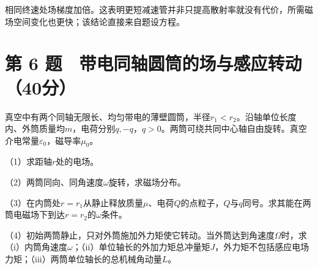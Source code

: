 \documentclass[12pt,a4paper,fontset=fandol]{ctexart}
\begin{document}
相同终速处场梯度加倍。这表明更短减速管并非只提高散射率就没有代价，所需磁场空间变化也更快；该结论直接来自题设方程。

\clearpage

\section{第 6
题　带电同轴圆筒的场与感应转动（40分）}\label{ux7b2c-6-ux9898-ux5e26ux7535ux540cux8f74ux5706ux7b52ux7684ux573aux4e0eux611fux5e94ux8f6cux52a840ux5206}

真空中有两个同轴无限长、均匀带电的薄壁圆筒，半径\(r_1<r_2\)。沿轴单位长度内、外筒质量均\(m\)，电荷分别\(q,-q\)，\(q>0\)。两筒可绕共同中心轴自由旋转。真空介电常量\(\varepsilon_0\)，磁导率\(\mu_0\)。

\begin{center}
\begin{minipage}{\linewidth}
\centering\begingroup{}
\ifdim\wd\diagrambox>.88\linewidth
\sbox{\diagrambox}{\resizebox{.88\linewidth}{!}{\usebox{\diagrambox}}}\fi
\ifdim\ht\diagrambox>.38\textheight
\resizebox{!}{.38\textheight}{\usebox{\diagrambox}}
\else\usebox{\diagrambox}\fi
\par{}\endgroup\end{minipage}\end{center}

（1）求距轴\(r\)处的电场。

（2）两筒同向、同角速度\(\omega\)旋转，求磁场分布。

（3）在内筒处\(r=r_1\)从静止释放质量\(\mu\)、电荷\(Q\)的点粒子，\(Q\)与\(q\)同号。求其能在两筒电磁场下到达\(r=r_2\)的\(\omega\)条件。

（4）初始两筒静止，只对外筒施加外力矩使它转动。当外筒达到角速度\(\Omega\)时，求（i）内筒角速度\(\omega\)；（ii）单位轴长的外加力矩总冲量矩\(J\)，外力矩不包括感应电场力矩；（iii）两筒单位轴长的总机械角动量\(L\)。
\end{document}
